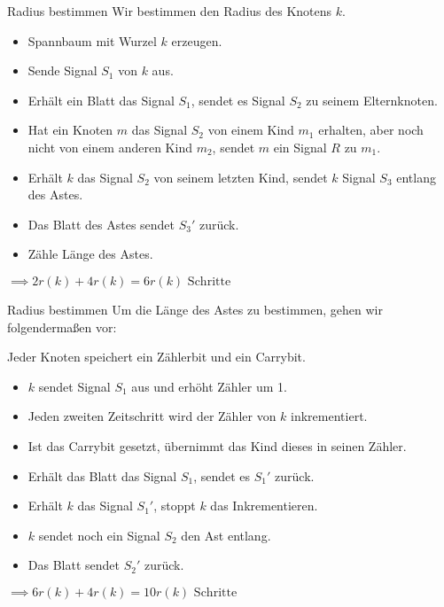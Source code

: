 \documentclass[18pt]{beamer}
\begin{document}
\begin{frame}{Radius bestimmen}
	Wir bestimmen den Radius des Knotens $k$.
	\begin{itemize}
		\item Spannbaum mit Wurzel $k$ erzeugen.
		\item Sende Signal $S_1$ von $k$ aus.
		\item Erhält ein Blatt das Signal $S_1$, sendet es Signal $S_2$ zu seinem Elternknoten.
		\item Hat ein Knoten $m$ das Signal $S_2$ von einem Kind $m_1$ erhalten, aber noch nicht von einem anderen Kind $m_2$, sendet $m$ ein Signal $R$ zu $m_1$.
		\item Erhält $k$ das Signal $S_2$ von seinem letzten Kind, sendet $k$ Signal $S_3$ entlang des Astes.
		\item Das Blatt des Astes sendet $S_3'$ zurück.
		\item Zähle Länge des Astes. 
	\end{itemize}
	$\implies 2r(k) + 4r(k) = 6r(k) \text{ Schritte}$
\end{frame}

\begin{frame}{Radius bestimmen}
	Um die Länge des Astes zu bestimmen, gehen wir folgendermaßen vor:
	
	Jeder Knoten speichert ein Zählerbit und ein Carrybit.
	\begin{itemize}
		\item $k$ sendet Signal $S_1$ aus und erhöht Zähler um 1. 
		\item Jeden zweiten Zeitschritt wird der Zähler von $k$ inkrementiert.
		\item Ist das Carrybit gesetzt, übernimmt das Kind dieses in seinen Zähler.
		\item Erhält das Blatt das Signal $S_1$, sendet es $S_1'$ zurück.
		\item Erhält $k$ das Signal $S_1'$, stoppt $k$ das Inkrementieren.
		\item $k$ sendet noch ein Signal $S_2$ den Ast entlang.
		\item Das Blatt sendet $S_2'$ zurück.
	\end{itemize}
	$\implies 6r(k) + 4r(k) = 10r(k) \text{ Schritte}$
\end{frame}
\end{document}

